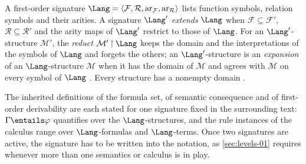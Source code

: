 A first-order signature
\(\Lang=\langle\mathcal F,\mathcal R,\operatorname{ar}_{\mathcal F},
\operatorname{ar}_{\mathcal R}\rangle\) lists function symbols, relation
symbols and their arities. A signature \(\Lang'\) \emph{extends}
\(\Lang\) when \(\mathcal F\subseteq\mathcal F'\),
\(\mathcal R\subseteq\mathcal R'\) and the arity maps of \(\Lang'\) restrict
to those of \(\Lang\). For an \(\Lang'\)-structure \(\mathcal M'\), the
\emph{reduct} \(\mathcal M'\mathbin{\upharpoonright}\Lang\) keeps the domain
and the interpretations of the symbols of \(\Lang\) and forgets the others;
an \(\Lang'\)-structure is an \emph{expansion} of an \(\Lang\)-structure
\(\mathcal M\) when it has the domain of \(\mathcal M\) and agrees with
\(\mathcal M\) on every symbol of \(\Lang\)
\cite[ch.~``Structures, Satisfaction, and Translation'', definition
``Signature extension, expansion, and reduct'']{FrozenFormalLogicLanguageChange}.
Every structure has a nonempty domain \cite[ch.~``Structures, Satisfaction,
and Translation'', definition ``First-order structure'']{FrozenFormalLogicLanguageChange}.

The inherited definitions of the formula set, of semantic consequence and of
first-order derivability are each stated for one signature fixed in the
surrounding text: \(\Gamma\entails\varphi\) quantifies over the
\(\Lang\)-structures, and the rule instances of the calculus range over
\(\Lang\)-formulas and \(\Lang\)-terms. Once two signatures are active, the
signature has to be written into the notation, as \cref{sec:levels-01}
requires whenever more than one semantics or calculus is in play.

